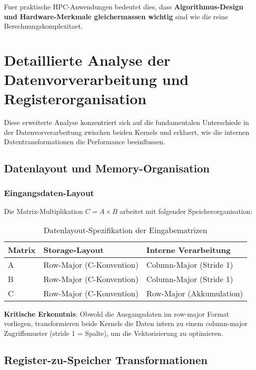 \documentclass[11pt,a4paper]{article}
\begin{document}
Fuer praktische HPC-Anwendungen bedeutet dies, dass \textbf{Algorithmus-Design und Hardware-Merkmale gleichermassen wichtig} sind wie die reine Berechnungskomplexitaet.

\section{Detaillierte Analyse der Datenvorverarbeitung und Registerorganisation}

Diese erweiterte Analyse konzentriert sich auf die fundamentalen Unterschiede in der Datenvorverarbeitung zwischen beiden Kernels und erklaert, wie die internen Datentransformationen die Performance beeinflussen.

\subsection{Datenlayout und Memory-Organisation}

\subsubsection{Eingangsdaten-Layout}

Die Matrix-Multiplikation $C = A \times B$ arbeitet mit folgender Speicherorganisation:

\begin{table}[h]
\centering
\caption{Datenlayout-Spezifikation der Eingabematrizen}
\begin{tabular}{|l|l|l|}
\hline
\textbf{Matrix} & \textbf{Storage-Layout} & \textbf{Interne Verarbeitung} \\
\hline
A & Row-Major (C-Konvention) & Column-Major (Stride 1) \\
B & Row-Major (C-Konvention) & Column-Major (Stride 1) \\
C & Row-Major (C-Konvention) & Row-Major (Akkumulation) \\
\hline
\end{tabular}
\end{table}

\textbf{Kritische Erkenntnis}: Obwohl die Ausgangsdaten im row-major Format vorliegen, transformieren beide Kernels die Daten intern zu einem column-major Zugriffsmuster (stride 1 = Spalte), um die Vektorisierung zu optimieren.

\subsection{Register-zu-Speicher Transformationen}
\end{document}

